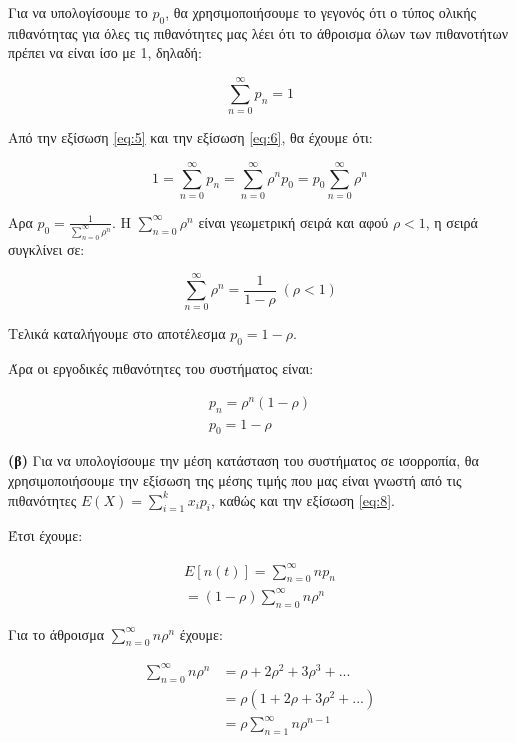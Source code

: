 \documentclass {article}
\begin{document}
Για να υπολογίσουμε το $p_0$, θα χρησιμοποιήσουμε το γεγονός ότι ο τύπος ολικής πιθανότητας για όλες τις πιθανότητες μας λέει ότι το άθροισμα όλων των πιθανοτήτων πρέπει να είναι ίσο με 1, δηλαδή:

\begin{equation}\label{eq:6}
	\sum_{n=0}^{\infty}{p_n} = 1
\end{equation}

Από την εξίσωση \ref{eq:5} και την εξίσωση \ref{eq:6}, θα έχουμε ότι:

\begin{equation}\label{eq:7}
	1 = \sum_{n=0}^{\infty}{p_n} = \sum_{n=0}^{\infty}{ρ^np_0} = p_0\sum_{n=0}^{\infty}{ρ^n}
\end{equation}

Αρα $p_0 = \frac{1}{\sum_{n=0}^{\infty}{ρ^n}}$. Η $\sum_{n=0}^{\infty}{ρ^n}$ είναι γεωμετρική σειρά και αφού $ρ < 1$, η σειρά συγκλίνει σε:

\begin{equation}
	\sum_{n=0}^{\infty}{ρ^n} = \frac{1}{1 - ρ} \; (ρ < 1)
\end{equation}

Τελικά καταλήγουμε στο αποτέλεσμα $p_0 = 1-ρ$.

Άρα οι εργοδικές πιθανότητες του συστήματος είναι:

\begin{align}
	p_n = ρ^n(1-ρ) \label{eq:8} \\
	p_0 = 1-ρ	\label{eq:9}
\end{align}


\textbf{(β)} Για να υπολογίσουμε την μέση κατάσταση του συστήματος σε ισορροπία, θα χρησιμοποιήσουμε την εξίσωση της μέσης τιμής που μας είναι γνωστή από τις πιθανότητες $ E(X) = \sum_{i=1}^k{x_ip_i}$, καθώς και την εξίσωση \ref{eq:8}.

Έτσι έχουμε:

\begin{equation} \label{eq:10}
	\begin{split}
		E[n(t)] = \sum_{n=0}^{\infty}{np_n} \\
		= (1-ρ) \sum_{n=0}^{\infty}{nρ^n}
	\end{split}
\end{equation}

Για  το άθροισμα $\sum_{n=0}^{\infty}{nρ^n}$ έχουμε:

\begin{equation} \label{eq:11}
	\begin{split}
		\sum_{n=0}^{\infty}{nρ^n} & = ρ + 2ρ^2 + 3ρ^3 + ...\\
		& = ρ(1 + 2ρ + 3ρ^2 + ...) \\
		& = ρ \sum_{n=1}^{\infty}{n ρ^{n-1}}
	\end{split}
\end{equation}
\end{document}
